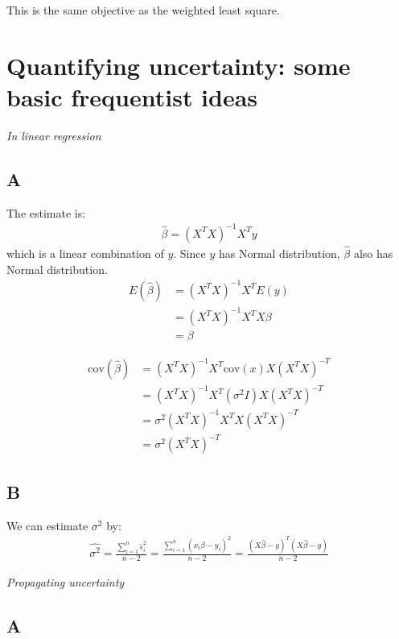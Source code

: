 \documentclass{article}
\begin{document}
This is the same objective as the weighted least square.

\section{Quantifying uncertainty: some basic frequentist ideas}
\textit{In linear regression}
\subsection*{A}

The estimate is:
\begin{align*}
\hat{\beta} = (X^TX)^{-1}X^Ty
\end{align*}
which is a linear combination of \(y\). Since \(y\) has Normal distribution, \(\hat{\beta}\) also has Normal distribution.
\begin{align*}
E(\hat{\beta}) &= (X^TX)^{-1}X^T E(y)\\
&= (X^TX)^{-1}X^T X\beta\\
&= \beta
\end{align*}

\begin{align*}
\mbox{cov}(\hat{\beta}) &= (X^TX)^{-1}X^T \mbox{cov}(x) X(X^TX)^{-T}\\
&= (X^TX)^{-1}X^T (\sigma^2 I) X(X^TX)^{-T}\\
&= \sigma^2 (X^TX)^{-1}X^T  X(X^TX)^{-T}\\
&= \sigma^2 (X^TX)^{-T}
\end{align*}

\subsection*{B}
We can estimate \(\sigma^2\) by:
\begin{align*}
\hat{\sigma^2} = \frac{\sum_{i=1}^n\hat{\epsilon}_i^2}{n-2} = \frac{\sum_{i=1}^n(x_i\hat{\beta} - y_i)^2}{n-2} = \frac{(X\hat{\beta} - y)^T(X\hat{\beta} - y)}{n-2}
\end{align*}

\textit{Propagating uncertainty}
\subsection*{A}
\end{document}
